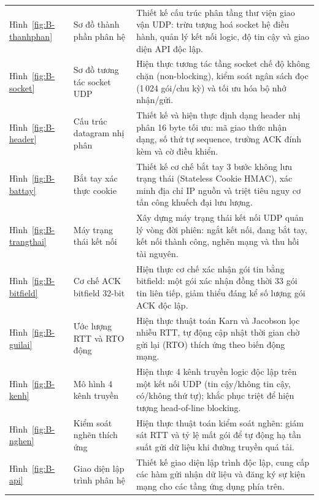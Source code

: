 \begin{center}\small
\begin{tabularx}{\linewidth}{|L{2.2cm}|L{4.2cm}|Y|}
\hline
{} &  &  \\ \hline
Hình~\ref{fig:B-thanhphan} & Sơ đồ thành phần phân hệ & Thiết kế cấu trúc phân tầng thư viện giao vận UDP: trừu tượng hoá socket hệ điều hành, quản lý kết nối logic, độ tin cậy và giao diện API độc lập. \\ \hline
Hình~\ref{fig:B-socket} & Sơ đồ tương tác socket UDP & Hiện thực tương tác tầng socket chế độ không chặn (non-blocking), kiểm soát ngân sách đọc (1\,024 gói/chu kỳ) và tối ưu hóa bộ nhớ nhận/gửi. \\ \hline
Hình~\ref{fig:B-header} & Cấu trúc datagram nhị phân & Thiết kế và hiện thực định dạng header nhị phân 16 byte tối ưu: mã giao thức nhận dạng, số thứ tự sequence, trường ACK đính kèm và cờ điều khiển. \\ \hline
Hình~\ref{fig:B-battay} & Bắt tay xác thực cookie & Thiết kế cơ chế bắt tay 3 bước không lưu trạng thái (Stateless Cookie HMAC), xác minh địa chỉ IP nguồn và triệt tiêu nguy cơ tấn công khuếch đại lưu lượng. \\ \hline
Hình~\ref{fig:B-trangthai} & Máy trạng thái kết nối & Xây dựng máy trạng thái kết nối UDP quản lý vòng đời phiên: ngắt kết nối, đang bắt tay, kết nối thành công, nghẽn mạng và thu hồi tài nguyên. \\ \hline
Hình~\ref{fig:B-bitfield} & Cơ chế ACK bitfield 32-bit & Hiện thực cơ chế xác nhận gói tin bằng bitfield: một gói xác nhận đồng thời 33 gói tin liên tiếp, giảm thiểu đáng kể số lượng gói ACK độc lập. \\ \hline
Hình~\ref{fig:B-guilai} & Ước lượng RTT và RTO động & Hiện thực thuật toán Karn và Jacobson lọc nhiễu RTT, tự động cập nhật thời gian chờ gửi lại (RTO) thích ứng theo biến động mạng. \\ \hline
Hình~\ref{fig:B-kenh} & Mô hình 4 kênh truyền & Hiện thực 4 kênh truyền logic độc lập trên một kết nối UDP (tin cậy/không tin cậy, có/không thứ tự); khắc phục triệt để hiện tượng head-of-line blocking. \\ \hline
Hình~\ref{fig:B-nghen} & Kiểm soát nghẽn thích ứng & Hiện thực thuật toán kiểm soát nghẽn: giám sát RTT và tỷ lệ mất gói để tự động hạ tần suất gửi dữ liệu khi đường truyền quá tải. \\ \hline
Hình~\ref{fig:B-api} & Giao diện lập trình phân hệ & Thiết kế giao diện lập trình độc lập, cung cấp các hàm gửi nhận dữ liệu và đăng ký sự kiện mạng cho các tầng ứng dụng phía trên. \\ \hline

\end{tabularx}
\end{center}
